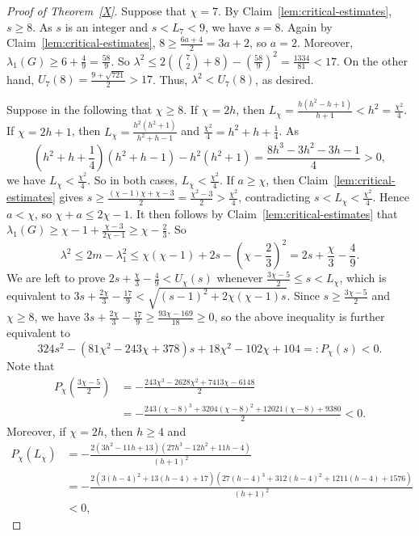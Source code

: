 \documentclass[12pt]{article}
\begin{document}
\begin{proof}[Proof of Theorem~\ref{X}]
Suppose that $\chi=7$. By Claim~\ref{lem:critical-estimates}, $s\ge8$. As $s$ is an integer and $s<L_7<9$, we have $s=8$. Again by Claim~\ref{lem:critical-estimates},
$8\ge\frac{6a+4}{2}=3a+2$, so $a=2$. Moreover, $\lambda_1(G)\ge6+\frac49=\frac{58}{9}$. So $\lambda^2\le2\left(\binom72+8\right)-\left(\frac{58}{9}\right)^2
 =\frac{1334}{81}<17$. On the other hand, $U_7(8)=\frac{9+\sqrt{721}}2>17$. Thus, $\lambda^2<U_7(8)$, as desired.


Suppose in the following that $\chi\ge8$.
If $\chi=2h$, then
$L_\chi=\frac{h(h^2-h+1)}{h+1}<h^2=\frac{\chi^2}{4}$.
If $\chi=2h+1$, then $L_\chi=\frac{h^2(h^2+1)}{h^2+h-1}$ and $\frac{\chi^2}{4}=h^2+h+\frac14$. As 
$$\left(h^2+h+\frac14\right)(h^2+h-1)-h^2(h^2+1)
 =\frac{8h^3-3h^2-3h-1}{4}>0,$$ we have $L_\chi<\frac{\chi^2}{4}$. So in both cases,  $L_\chi<\frac{\chi^2}{4}$. 
If $a\ge \chi$, then Claim~\ref{lem:critical-estimates} gives
$s\ge\frac{(\chi-1)\chi+\chi-3}{2}=\frac{\chi^2-3}{2}>\frac{\chi^2}{4}$,
contradicting $s<L_\chi<\frac{\chi^2}{4}$. Hence $a<\chi$, so $\chi+a\le2\chi-1$. It then follows by Claim~\ref{lem:critical-estimates} that
$\lambda_1(G)\ge \chi-1+\frac{\chi-3}{2\chi-1}\ge \chi-\frac23$. %
So 
\[
\lambda^2\le 2m-\lambda_1^2\le \chi(\chi-1)+2s-\left(\chi-\frac23\right)^2
 =2s+\frac{\chi}{3}-\frac49. %
\]
We are left  to prove $2s+\frac{\chi}{3}-\frac49<U_\chi(s)$ whenever
$\frac{3\chi-5}{2}\le s<L_\chi$, which is equivalent to $3s+\frac{2\chi}{3}-\frac{17}{9}<\sqrt{(s-1)^2+2\chi(\chi-1)s}$. Since $s\ge \frac{3\chi-5}{2}$ and $\chi\ge 8$, we have $3s+\frac{2\chi}{3}-\frac{17}{9}\ge \frac{93\chi-169}{18}\ge 0$, so the above inequality is further equivalent to \[
324s^2-(81\chi^2-243\chi+378)s+18\chi^2-102\chi+104=:P_\chi(s)<0. 
\]
Note that
\begin{align*}
P_\chi\left(\frac{3\chi-5}{2}\right)&=-\frac{243\chi^3-2628\chi^2+7413\chi-6148}{2}\\
&=-\frac{243(\chi-8)^3+3204(\chi-8)^2+12021(\chi-8)+9380}{2}<0.
\end{align*} %
Moreover, if $\chi=2h$, then $h\ge 4$ and
\begin{align*}
P_{\chi}(L_\chi) &=-\frac{2(3h^2-11h+13)(27h^3-12h^2+11h-4)}{(h+1)^2}\\
&=-\frac{2\left(3(h-4)^2+13(h-4)+17\right)\left(27(h-4)^3+312(h-4)^2+1211(h-4)+1576\right)}{(h+1)^2}\\
&<0,
\end{align*}

\end{proof}
\end{document}
